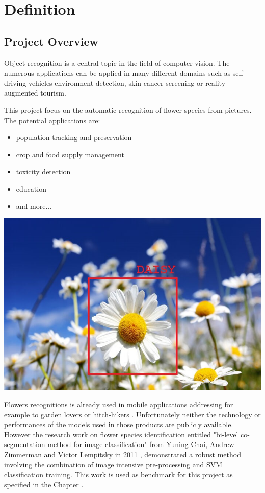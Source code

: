 \section{Definition}

\subsection{Project Overview}

Object recognition is a central topic in the field of computer vision. The numerous applications can be applied in many different domains such as self-driving vehicles environment detection, skin cancer screening or reality augmented tourism.


This project focus on the automatic recognition of flower species from pictures. The potential applications are:

\begin{itemize}
	\setlength\itemsep{1pt}
	\setlength{\parskip}{0pt}
	\setlength{\parsep}{0pt}
	\item population tracking and preservation
	\item crop and food supply management 
	\item toxicity detection 
	\item education
	\item and more...
\end{itemize}

\begin{center}
\includegraphics[scale=1.3]{Daisy_detection.jpg}
\end{center}

Flowers recognitions is already used in mobile applications addressing for example to garden lovers or hitch-hikers \cite{best-apps}. Unfortunately neither the technology or performances of the models used in those products are publicly available. 
However the research work on flower species identification entitled "bi-level co-segmentation method for image classification" from Yuning Chai, Andrew Zimmerman and Victor Lempitsky in 2011 \cite{Chai_BiCos}, demonstrated a robust method involving the combination of image intensive pre-processing and SVM classification training. This work is used as benchmark for this project as specified in the Chapter .

